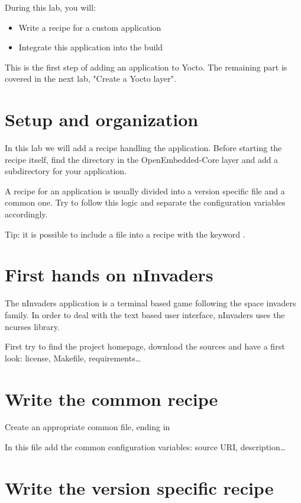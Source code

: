 
During this lab, you will:
\begin{itemize}
  \item Write a recipe for a custom application
  \item Integrate this application into the build
\end{itemize}

This is the first step of adding an application to Yocto. The
remaining part is covered in the next lab, "Create a Yocto layer".

\section{Setup and organization}

In this lab we will add a recipe handling the 
application. Before starting the recipe itself, find the
 directory in the OpenEmbedded-Core layer and
add a subdirectory for your application.

A recipe for an application is usually divided into a version specific 
file and a common one. Try to follow this logic and separate the configuration
variables accordingly.

Tip: it is possible to include a file into a recipe with the keyword
.

\section{First hands on nInvaders}

The nInvaders application is a terminal based game following the space invaders
family. In order to deal with the text based user interface, nInvaders uses the
ncurses library.

First try to find the project homepage, download the sources and have a first
look: license, Makefile, requirements\dots

\section{Write the common recipe}

Create an appropriate common file, ending in 

In this file add the common configuration variables: source URI,
description\dots

\section{Write the version specific recipe}

